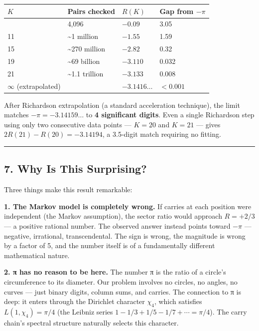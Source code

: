 \documentclass[
  11pt,
]{article}
\begin{document}
\begin{longtable}[]{@{}llll@{}}
\toprule\noalign{}
\(K\) & Pairs checked & \(R(K)\) & Gap from \(-\pi\) \\
\midrule\noalign{}
\endhead
\bottomrule\noalign{}
\endlastfoot
7 & 4,096 & \(-0.09\) & 3.05 \\
11 & \textasciitilde1 million & \(-1.55\) & 1.59 \\
15 & \textasciitilde270 million & \(-2.82\) & 0.32 \\
19 & \textasciitilde69 billion & \(-3.110\) & 0.032 \\
21 & \textasciitilde1.1 trillion & \(-3.133\) & 0.008 \\
\(\infty\) (extrapolated) & & \(-3.1416\ldots\) & \(< 0.001\) \\
\end{longtable}

After Richardson extrapolation (a standard acceleration technique), the limit
matches \(-\pi = -3.14159\ldots\) to \textbf{4 significant digits}. Even a
single Richardson step using only two consecutive data points --- \(K = 20\) and
\(K = 21\) --- gives \(2R(21) - R(20) = -3.14194\), a 3.5-digit match requiring
no fitting.

\begin{center}\rule{0.5\linewidth}{0.5pt}\end{center}

\newpage

\subsection{7. Why Is This Surprising?}\label{why-is-this-surprising}

Three things make this result remarkable:

\textbf{1. The Markov model is completely wrong.} If carries at each position
were independent (the Markov assumption), the sector ratio would approach
\(R = +2/3\) --- a positive rational number. The observed answer instead points
toward \(-\pi\) --- negative, irrational, transcendental. The sign is wrong, the
magnitude is wrong by a factor of 5, and the number itself is of a fundamentally
different mathematical nature.

\textbf{2. π has no reason to be here.} The number π is the ratio of a circle's
circumference to its diameter. Our problem involves no circles, no angles, no
curves --- just binary digits, column sums, and carries. The connection to π is
deep: it enters through the Dirichlet character \(\chi_4\), which satisfies
\(L(1, \chi_4) = \pi/4\) (the Leibniz series
\(1 - 1/3 + 1/5 - 1/7 + \cdots = \pi/4\)). The carry chain's spectral structure
naturally selects this character.
\end{document}
